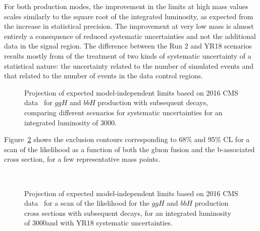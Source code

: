 For both production modes, 
the improvement in the limits at high mass values
scales similarly to the square root of the integrated luminosity,
as expected from the increase in statistical precision.
The improvement at very low mass is almost entirely a consequence of reduced systematic uncertainties
and not the additional data in the signal region. 
The difference between the Run 2 and YR18 scenarios results mostly from of the treatment 
of two kinds of systematic uncertainty of a statistical nature: 
the uncertainty related to the number of simulated events 
and that related to the number 
of events in the data control regions.
%
\begin{figure}[htbp]
\begin{center}
\end{center}
\caption{Projection of expected model-independent limits based on 2016 CMS data~\cite{HIG-17-020} 
for $ggH$ and $bbH$ production with subsequent \htt decays, comparing different 
scenarios for systematic uncertainties for an integrated luminosity of 3000\fbinv.}
\label{fig:model_indep2}
\end{figure}

Figure~\ref{fig:model_indep2d}  shows the exclusion contours corresponding to 68\% and 95\% CL for a scan of the likelihood as a function of both the gluon fusion and the b-associated cross section, for a few representative mass points.
%
\begin{figure}[htbp]
\begin{center}
\\
\end{center}
\caption{Projection of expected model-independent limits based on 2016 CMS data~\cite{HIG-17-020} for a scan of the likelihood for the $ggH$ and $bbH$ production cross sections with subsequent \htt decays, 
for an integrated luminosity of 3000\fbinv and with YR18 systematic uncertainties.}
\label{fig:model_indep2d}
\end{figure}
